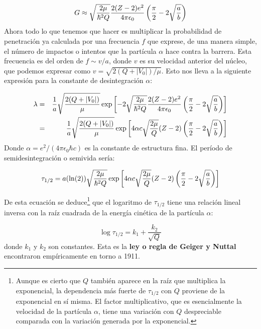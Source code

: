 \begin{equation}
    G \approx  \sqrt{\frac{2\mu}{\hbar^2Q}} \frac{2(Z-2)e^2}{4 \pi \epsilon_0} \left( \frac{\pi}{2} -2 \sqrt{\frac{a}{b}} \right)
\end{equation}
Ahora todo lo que tenemos que hacer es multiplicar la probabilidad de penetración ya calculada por una frecuencia $f$ que exprese, de una manera simple, el número de impactos o intentos que la partícula $\alpha$ hace contra la barrera. Esta frecuencia es del orden de $f \sim v/a$, donde $v$ es su velocidad anterior del núcleo, que podemos expresar como $v=\sqrt{2(Q+|V_0|)/\mu}$. Esto nos lleva a la siguiente expresión para la constante de desintegración $\alpha$:

\begin{eqnarray}
    \lambda & = & \frac{1}{a} \sqrt{\frac{2(Q+|V_0|)}{\mu}} \exp \ccorchetes{-2  \sqrt{\frac{2 \mu}{\hbar^2 Q}} \frac{2(Z-2)e^2}{4 \pi \epsilon_0} \parentesis{\frac{\pi}{2}-2\sqrt{\frac{a}{b}}}} \\ \vspace{5.0mm}
            & = & \frac{1}{a} \sqrt{\frac{2(Q+|V_0|)}{\mu}}  \exp \ccorchetes{4 \alpha c \sqrt{\frac{2 \mu}{Q}} (Z-2) \parentesis{\frac{\pi}{2}-2\sqrt{\frac{a}{b}}}}
\end{eqnarray}
Donde $\alpha=e^2/(4 \pi \epsilon_0 \hbar c)$ es la constante de estructura fina. El período de semidesintegración o semivida sería:
\begin{mybox}
\begin{equation}
    \tau_{1/2} = a (\ln (2)) \sqrt{\frac{2\mu}{\hbar^2Q}} \exp \left[ 4 \alpha c \sqrt{\frac{2 \mu}{Q}} (Z-2) \left( \frac{\pi}{2}-2\sqrt{\frac{a}{b}} \right) \right]
\end{equation}
\end{mybox}
De esta ecuación se deduce\footnote{Aunque es cierto que $Q$ también aparece en la raíz que multiplica la exponencial, la dependencia más fuerte de $\tau_{1/2}$ con $Q$ proviene de la exponencial en sí misma. El factor multiplicativo, que es esencialmente la velocidad de la partícula $\alpha$, tiene una variación con $Q$ despreciable comparada con la variación generada por la exponencial.} que el logaritmo de $\tau_{1/2}$ tiene una relación lineal inversa con la raíz cuadrada de la energía cinética de la partícula $\alpha$:

\begin{equation}
    \log \tau_{1/2} = k_1 + \frac{k_2}{\sqrt{Q}}
\end{equation}
donde $k_1$ y $k_2$ son constantes. Esta es la \textbf{ley o regla de Geiger y Nuttal} encontraron empíricamente en torno a 1911. %

